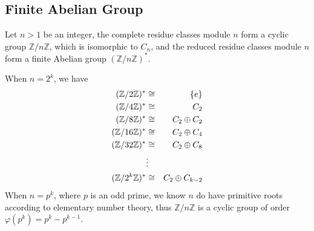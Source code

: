 \subsection{Finite Abelian Group}
Let $n > 1$ be an integer,
the complete residue classes module $n$ form a cyclic group $\mathbb{Z} / n \mathbb{Z}$,
which is isomorphic to $C_n$,
and the reduced residue classes module $n$ form a
finite Abelian group $(\mathbb{Z} / n \mathbb{Z})^\ast$.

When $n=2^k$, we have
\begin{eqnarray*}
(\mathbb{Z} / 2 \mathbb{Z})^\ast & \cong & \{ e \}	\cr
(\mathbb{Z} / 4 \mathbb{Z})^\ast & \cong &  C_2	\cr
(\mathbb{Z} / 8 \mathbb{Z})^\ast & \cong &  C_2 \oplus C_2	\cr
(\mathbb{Z} / 16 \mathbb{Z})^\ast & \cong &  C_2 \oplus C_4	\cr
(\mathbb{Z} / 32 \mathbb{Z})^\ast & \cong &  C_2 \oplus C_8	\cr
					& \vdots &	\cr
(\mathbb{Z} / 2^k \mathbb{Z})^\ast & \cong & C_2 \oplus C_{k-2}	\cr
\end{eqnarray*}
When $n=p^k$, where $p$ is an odd prime, we know $n$ do
have primitive roots according to elementary number theory,
thus $\mathbb{Z} / n \mathbb{Z}$ is a cyclic group
of order $\varphi(p^k) = p^k - p^{k-1}$.

